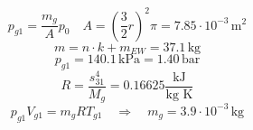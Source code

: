 \item[(3.a)] 
    \[
    p_{g1} = \frac{m_g}{A} p_0 \quad A = \left(\frac{3}{2} r\right)^2 \pi = 7.85 \cdot 10^{-3} \, \text{m}^2
    \]
    \[
    m = n \cdot k + m_{EW} = 37.1 \, \text{kg}
    \]
    \[
    p_{g1} = 140.1 \, \text{kPa} = 1.40 \, \text{bar}
    \]
    \[
    R = \frac{s_{31}^4}{M_g} = 0.16625 \frac{\text{kJ}}{\text{kg K}}
    \]
    \[
    p_{g1} V_{g1} = m_g R T_{g1} \quad \Rightarrow \quad m_g = 3.9 \cdot 10^{-3} \, \text{kg}
    \]